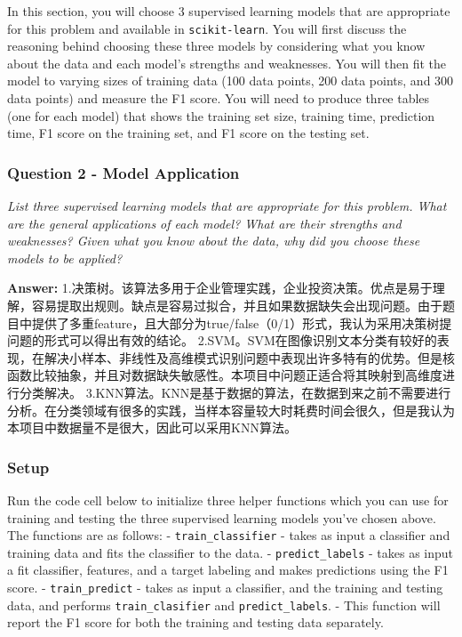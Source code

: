 \documentclass{ctexart}
\begin{document}
In this section, you will choose 3 supervised learning models that are
appropriate for this problem and available in \texttt{scikit-learn}. You
will first discuss the reasoning behind choosing these three models by
considering what you know about the data and each model's strengths and
weaknesses. You will then fit the model to varying sizes of training
data (100 data points, 200 data points, and 300 data points) and measure
the F1 score. You will need to produce three tables (one for each model)
that shows the training set size, training time, prediction time, F1
score on the training set, and F1 score on the testing set.

    \subsubsection{Question 2 - Model
Application}\label{question-2---model-application}

\emph{List three supervised learning models that are appropriate for
this problem. What are the general applications of each model? What are
their strengths and weaknesses? Given what you know about the data, why
did you choose these models to be applied?}

    \textbf{Answer: }
1.决策树。该算法多用于企业管理实践，企业投资决策。优点是易于理解，容易提取出规则。缺点是容易过拟合，并且如果数据缺失会出现问题。由于题目中提供了多重feature，且大部分为true/false（0/1）形式，我认为采用决策树提问题的形式可以得出有效的结论。
2.SVM。SVM在图像识别文本分类有较好的表现，在解决小样本、非线性及高维模式识别问题中表现出许多特有的优势。但是核函数比较抽象，并且对数据缺失敏感性。本项目中问题正适合将其映射到高维度进行分类解决。
3.KNN算法。KNN是基于数据的算法，在数据到来之前不需要进行分析。在分类领域有很多的实践，当样本容量较大时耗费时间会很久，但是我认为本项目中数据量不是很大，因此可以采用KNN算法。

    \subsubsection{Setup}\label{setup}

Run the code cell below to initialize three helper functions which you
can use for training and testing the three supervised learning models
you've chosen above. The functions are as follows: -
\texttt{train\_classifier} - takes as input a classifier and training
data and fits the classifier to the data. - \texttt{predict\_labels} -
takes as input a fit classifier, features, and a target labeling and
makes predictions using the F1 score. - \texttt{train\_predict} - takes
as input a classifier, and the training and testing data, and performs
\texttt{train\_clasifier} and \texttt{predict\_labels}. - This function
will report the F1 score for both the training and testing data
separately.
\end{document}
